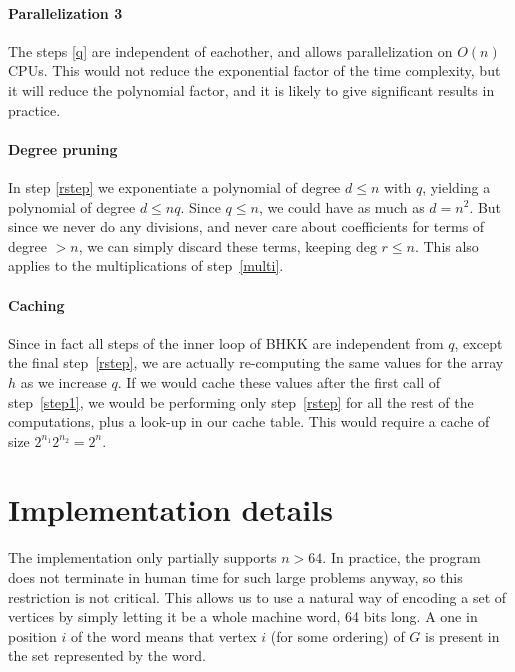 \documentclass[a4paper]{article}
\begin{document}
\paragraph{Parallelization 3} The steps \ref{q} are independent of eachother, and allows parallelization on $O(n)$ CPUs. This would not reduce the exponential factor of the time complexity, but it will reduce the polynomial factor, and it is likely to give significant results in practice.

\paragraph{Degree pruning} In step \ref{rstep} we exponentiate a polynomial of degree $d \leq n$ with $q$, yielding a polynomial of degree $d \leq nq$. Since $q \leq n$, we could have as much as $d = n^2$. But since we never do any divisions, and never care about coefficients for terms of degree $> n$, we can simply discard these terms, keeping $\text{deg } r \leq n$. This also applies to the multiplications of step~\ref{multi}.

\paragraph{Caching} Since in fact all steps of the inner loop of BHKK are independent from $q$, except the final step~\ref{rstep}, we are actually re-computing the same values for the array $h$ as we increase $q$. If we would cache these values after the first call of step~\ref{step1}, we would be performing only step~\ref{rstep} for all the rest of the computations, plus a look-up in our cache table. This would require a cache of size $2^{n_1} 2^{n_2} = 2^n$.


\section{Implementation details}
The implementation only partially supports $n > 64$. In practice, the program does not terminate in human time for such large problems anyway, so this restriction is not critical. This allows us to use a natural way of encoding a set of vertices by simply letting it be a whole machine word, 64 bits long. A one in position $i$ of the word means that vertex $i$ (for some ordering) of $G$ is present in the set represented by the word.

\end{document}
